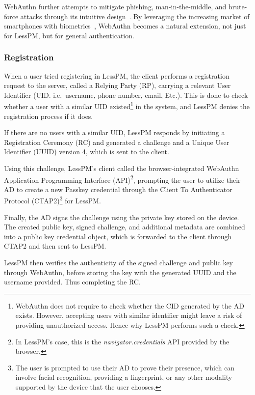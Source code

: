 WebAuthn further attempts to mitigate phishing, man-in-the-middle, and
brute-force attacks through its intuitive design~\cite{webauthn_level_2}.
By leveraging the increasing market of smartphones with
biometrics~\cite{statista-biometric-transactions}, WebAuthn becomes a natural
extension, not just for LessPM, but for general authentication.

\subsubsection{Registration}\label{subsubsec:metho-registration}
When a user tried registering in LessPM, the client performs a
registration request to the server, called a Relying Party (RP), carrying a
relevant User Identifier (UID. i.e.\ username, phone number, email, Etc.).
This is done to check whether a user with a similar UID existed\footnote{
  WebAuthn does not require to check whether the CID generated by the AD exists.
  However, accepting users with similar identifier might leave a risk of
  providing unauthorized access.
  Hence why LessPM performs such a check.
} in the system, and LessPM denies the registration process if it does.

If there are no users with a similar UID, LessPM responds by initiating a
Registration Ceremony (RC) and generated a challenge and a Unique User
Identifier (UUID) version 4, which is sent to the client.

Using this challenge, LessPM's client called the browser-integrated WebAuthn
Application Programming Interface (API)\footnote{
  In LessPM's case, this is the \textit{navigator.credentials} API provided by
  the browser.
}, prompting the
user to utilize their AD to create a new Passkey credential
through the Client To Authenticator Protocol (CTAP2)\footnote{
  The user is prompted to use their AD to prove their presence, which can
  involve facial recognition, providing a fingerprint, or any other modality
  supported by the device that the user chooses.
} for
LessPM\@.

Finally, the AD signs the challenge using the private key stored on the
device.
The created public key, signed challenge, and additional metadata are combined
into a public key credential object, which is forwarded to the client
through CTAP2 and then sent to LessPM\@.

LessPM then verifies the authenticity of the signed challenge and public key
through WebAuthn, before storing the key with the generated UUID and the
username provided.
Thus completing the RC\@.

